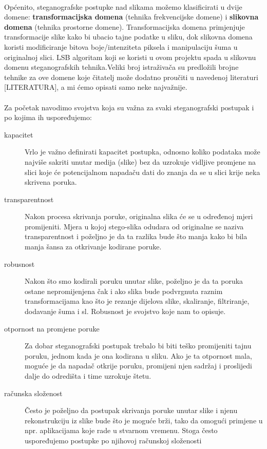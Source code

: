 \documentclass[times, utf8, seminar, numeric]{fer}
\begin{document}
\paragraph{}
Općenito, steganografske postupke nad slikama možemo klasificirati u dvije domene:
\textbf{transformacijska domena} (tehnika frekvencijske domene) i \textbf{slikovna domena} (tehnika prostorne domene). Transformacijska domena primjenjuje transformacije slike kako bi ubacio tajne podatke u sliku, dok slikovna domena koristi modificiranje bitova boje/intenziteta piksela i manipulaciju šuma u originalnoj slici. LSB algoritam koji se koristi u ovom projektu spada u slikovnu domenu steganografskih tehnika.Veliki broj istraživača su predložili brojne tehnike za ove domene koje čitatelj može dodatno proučiti u navedenoj literaturi [LITERATURA], a mi ćemo opisati samo neke najvažnije.
\paragraph{}
Za početak navodimo svojstva koja su važna za svaki steganografski postupak i po kojima ih uspoređujemo:
\begin{description}

\item[kapacitet] Vrlo je važno definirati kapacitet postupka, odnosno koliko podataka može najviše sakriti unutar medija (slike) bez da uzrokuje vidljive promjene na slici koje će potencijalnom napadaču dati do znanja da se u slici krije neka skrivena poruka.
\item[transparentnost] Nakon procesa skrivanja poruke, originalna slika će se u određenoj mjeri promijeniti. Mjera u kojoj stego-slika odudara od originalne se naziva transparentnost i poželjno je da ta razlika bude što manja kako bi bila manja šansa za otkrivanje kodirane poruke.
\item[robusnost]  Nakon što smo kodirali poruku unutar slike, poželjno je da ta poruka ostane nepromijenjena čak i ako slika bude podvrgnuta raznim transformacijama kao što je rezanje dijelova slike, skaliranje, filtriranje, dodavanje šuma i sl. Robusnost je svojstvo koje nam to opisuje.
\item[otpornost na promjene poruke] Za dobar steganografski postupak trebalo bi biti teško promijeniti tajnu poruku, jednom kada je ona kodirana u sliku. Ako je ta otpornost mala, moguće je da napadač otkrije poruku, promijeni njen sadržaj i proslijedi dalje do odredišta i time uzrokuje štetu.
\item[računska složenost] Često je poželjno da postupak skrivanja poruke unutar slike i njenu rekonstrukciju iz slike bude što je moguće brži, tako da omogući primjene u npr. aplikacijama koje rade u stvarnom vremenu. Stoga često uspoređujemo postupke po njihovoj računskoj složenosti
\end{description}
\end{document}
